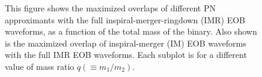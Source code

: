 \documentclass[aps,
prd,
amsmath,
amssymb,
twocolumn,
floatfix,
groupedaddress]{revtex4-1}
\def\l({\left(}
\def\r){\right)}
\begin{document}
\begin{figure}[htbp]
\begin{center}
{	
	}
	\caption{This figure shows the maximized overlaps of different PN approximants with the full inspiral-merger-ringdown (IMR) EOB waveforms, as a function of the total mass of the binary. Also shown is the maximized overlap of inspiral-merger (IM) EOB waveforms with the full IMR EOB waveforms.  Each subplot is for a different value of mass ratio $q \l(\equiv m_1/m_2\r)$.}
  \label{fig:Olaps}
  \end{center}
\end{figure}
\end{document}
